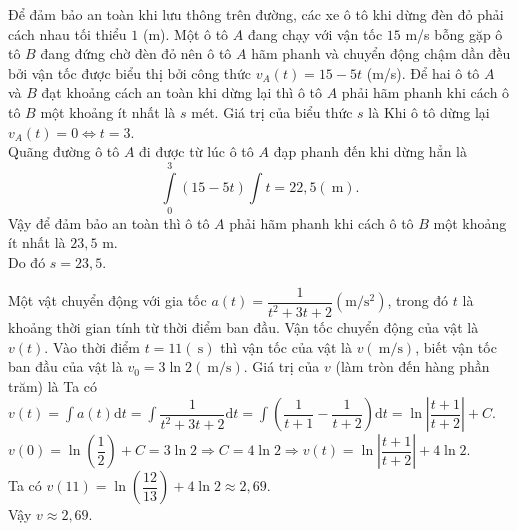 \begin{bt}%
	Để đảm bảo an toàn khi lưu thông trên đường, các xe ô tô khi dừng đèn đỏ phải cách nhau tối thiểu $1$ (m). Một ô tô $A$ đang chạy với vận tốc $15$ m/s bỗng gặp ô tô $B$ đang đứng chờ đèn đỏ nên ô tô $A$ hãm phanh và chuyển động chậm dần đều bởi vận tốc được biểu thị bởi công thức $v_A(t)=15-5 t$ (m/s). Để hai ô tô $A$ và $B$ đạt khoảng cách an toàn khi dừng lại thì ô tô $A$ phải hãm phanh khi cách ô tô $B$ một khoảng ít nhất là $s$ mét. Giá trị của biểu thức $s$ là
	\loigiai
	{Khi ô tô dừng lại $v_A(t)=0 \Leftrightarrow t=3$.\\
		Quãng đường ô tô $A$ đi được từ lúc ô tô $A$ đạp phanh đến khi dừng hẳn là
		$$\displaystyle\int\limits_0^3(15-5 t)\displaystyle\int\limits t=22,5 (\mathrm{~m}).$$
		Vậy để đảm bảo an toàn thì ô tô $A$ phải hãm phanh khi cách ô tô $B$ một khoảng ít nhất là $23{,}5$ m.\\
		Do đó $s=23{,}5$.
	}
\end{bt}

\begin{bt}%
	Một vật chuyển động với gia tốc $a(t)=\dfrac{1}{t^2+3 t+2} \left(\mathrm{m} / \mathrm{s}^2\right)$, trong đó $t$ là khoảng thời gian tính từ thời điểm ban đầu. Vận tốc chuyển động của vật là $v(t)$. Vào thời điểm $t=11(\mathrm{~s})$ thì vận tốc của vật là $v(\mathrm{~m} / \mathrm{s})$, biết vận tốc ban đầu của vật là $v_0=3 \ln 2(\mathrm{~m} / \mathrm{s})$. Giá trị của $v$ (làm tròn đến hàng phần trăm) là
	\loigiai
	{Ta có $v(t)=\displaystyle\int\limits a(t) \mathrm{d}t=\displaystyle\int\limits\dfrac{1}{t^2+3 t+2} \mathrm{d}t=\displaystyle\int\limits\left(\dfrac{1}{t+1}-\dfrac{1}{t+2}\right) \mathrm{d}t=\ln \left|\dfrac{t+1}{t+2}\right|+C$.\\
		$v(0)=\ln \left(\dfrac{1}{2}\right)+C=3 \ln 2 \Rightarrow C=4 \ln 2 \Rightarrow v(t)=\ln \left|\dfrac{t+1}{t+2}\right|+4 \ln 2$.\\
		Ta có $v(11)=\ln \left(\dfrac{12}{13}\right)+4 \ln 2 \approx 2{,}69$.\\
		Vậy $v \approx 2{,}69$.
	}
\end{bt}

